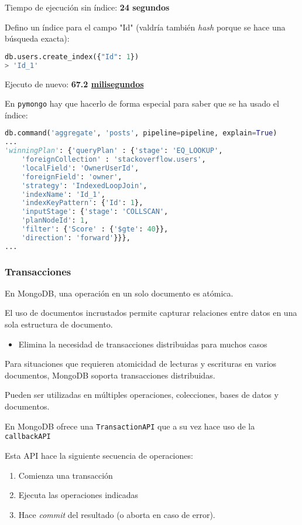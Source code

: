 Tiempo de ejecución sin índice: \textbf{24 segundos}

Defino un índice para el campo "Id" (valdría también \textit{hash} porque se hace una búsqueda exacta):
\begin{lstlisting}[language=python]
db.users.create_index({"Id": 1})
> 'Id_1'
\end{lstlisting}
Ejecuto de nuevo: \textbf{67.2 \underline{milisegundos}}

En \texttt{pymongo} hay que hacerlo de forma especial para saber que se ha usado el índice:
\begin{lstlisting}[language=python]
db.command('aggregate', 'posts', pipeline=pipeline, explain=True)
...
'winningPlan': {'queryPlan' : {'stage': 'EQ_LOOKUP',
	'foreignCollection' : 'stackoverflow.users',
	'localField': 'OwnerUserId',
	'foreignField': 'owner',
	'strategy': 'IndexedLoopJoin',
	'indexName': 'Id_1',
	'indexKeyPattern': {'Id': 1},
	'inputStage': {'stage': 'COLLSCAN',
	'planNodeId': 1,
	'filter': {'Score' : {'$gte': 40}},
	'direction': 'forward'}}},
...
\end{lstlisting}
\subsubsection{Transacciones}
En MongoDB, una operación en un solo documento es atómica.

El uso de documentos incrustados permite capturar relaciones entre datos en una sola estructura de documento.
\begin{itemize}
	\item Elimina la necesidad de transacciones distribuidas para muchos casos
\end{itemize}
Para situaciones que requieren atomicidad de lecturas y escrituras en varios documentos, MongoDB soporta transacciones distribuidas.

Pueden ser utilizadas en múltiples operaciones, colecciones, bases de datos y documentos.

En MongoDB ofrece una \texttt{TransactionAPI} que a su vez hace uso de la \texttt{callbackAPI}

Esta API hace la siguiente secuencia de operaciones:
\begin{enumerate}[label=\arabic*)]
	\item Comienza una transacción
	\item Ejecuta las operaciones indicadas
	\item Hace \textit{commit} del resultado (o aborta en caso de error).
\end{enumerate}
\Ej

